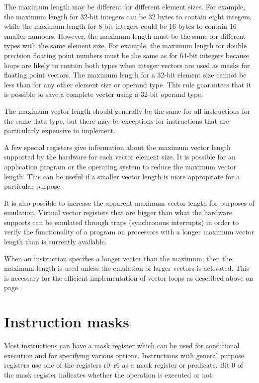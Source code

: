 \documentclass[forwardcom.tex]{subfiles}
\begin{document}
The maximum length may be different for different element sizes. For example, the maximum length for 32-bit integers can be 32 bytes to contain eight integers, while the maximum length for 8-bit integers could be 16 bytes to contain 16 smaller numbers. However, the maximum length must be the same for different types with the same element size. For example, the maximum length for double precision floating point numbers must be the same as for 64-bit integers because loops are likely to contain both types when integer vectors are used as masks for floating point vectors. The maximum length for a 32-bit element size cannot be less than for any other element size or operand type. This rule guarantees that it is possible to save a complete vector using a 32-bit operand type.
\vspace{2mm}

The maximum vector length should generally be the same for all instructions for the same data type, but there may be exceptions for instructions that are particularly expensive to implement. 
\vspace{2mm}

A few special registers give information about the maximum vector length supported by the hardware for each vector element size. It is possible for an application program or the operating system to reduce the maximum vector length. This can be useful if a smaller vector length is more appropriate for a particular purpose.
\vspace{2mm}

It is also possible to increase the apparent maximum vector length for purposes of emulation. Virtual vector registers that are bigger than what the hardware supports can be emulated through traps (synchronous interrupts) in order to verify the functionality of a program on processors with a longer maximum vector length than is currently available.
\vspace{2mm}

When an instruction specifies a longer vector than the maximum, then the maximum length is used unless the emulation of larger vectors is activated. This is necessary for the efficient implementation of vector loops as described above on page \pageref{vectorLoops}.

\section{Instruction masks}
Most instructions can have a mask register which can be used for conditional execution and for specifying various options. Instructions with general purpose registers use one of the registers r0--r6 as a mask register or predicate. Bit 0 of the mask register indicates whether the operation is executed or not.
\vspace{2mm}
\end{document}
